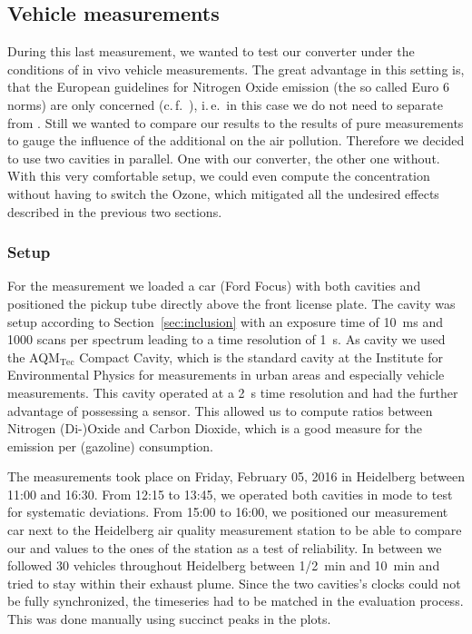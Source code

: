 \subsection{Vehicle measurements}
\label{sec:vehicle}

During this last measurement, we wanted to test our converter under
the conditions of in vivo vehicle measurements. The great advantage in
this setting is, that the European guidelines for Nitrogen Oxide
emission (the so called Euro 6 norms) are only concerned 
(c.\,f.~\cite{eu}), i.\,e.\ in this case we do not need to separate
 from . Still we wanted to compare our 
results to the results of pure  measurements to gauge the
influence of the additional  on the air pollution. Therefore we
decided to use two cavities in parallel. One with our converter, the
other one without. With this very comfortable setup, we could even
compute the  concentration without having to switch the Ozone,
which mitigated all the undesired effects described in the previous
two sections.

\subsubsection{Setup}
\label{sec:vehicle-setup}

For the measurement we loaded a car (Ford Focus) with both cavities
and positioned the pickup tube directly above the front license
plate. The  cavity was setup according to
Section~\ref{sec:inclusion} with an exposure time of
\SI{10}{\milli\second} and 1000 scans per spectrum leading to a time
resolution of \SI{1}{\second}. As  cavity we used the
AQM$_{\text{Tec}}$ Compact Cavity, which is the standard cavity at the
Institute for Environmental Physics for  measurements in urban
areas and especially vehicle measurements. This cavity operated at a
\SI{2}{\second} time resolution and had the further advantage of
possessing a  sensor. This allowed us to compute ratios
between Nitrogen (Di-)Oxide and Carbon Dioxide, which is a good
measure for the emission per (gazoline) consumption.

The measurements took place on Friday, February 05, 2016 in Heidelberg
between 11:00 and 16:30. From 12:15 to 13:45, we operated both
cavities in  mode to test for systematic deviations. From
15:00 to 16:00, we positioned our measurement car next to the
Heidelberg air quality measurement station to be able to compare our
 and  values to the ones of the station as a test of
reliability. In between we followed 30 vehicles throughout
Heidelberg between {\nfrac{} 1/2}~\si{\minute} and \SI{10}{\minute}
and tried to stay within their exhaust plume. Since the two cavities's
clocks could not be fully synchronized, the timeseries had to be
matched in the evaluation process. This was done manually using succinct
peaks in the plots.

